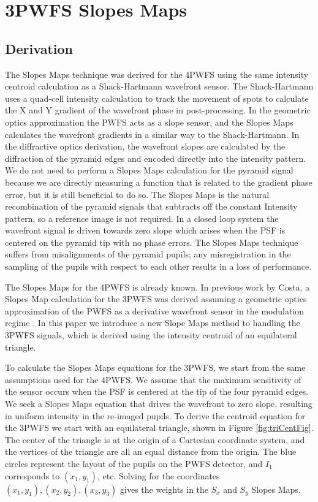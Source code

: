 \section{3PWFS Slopes Maps}\label{Slopes}

\subsection{Derivation}\label{SlopesDerivation}

The Slopes Maps technique was derived for the 4PWFS using the same intensity centroid calculation as a Shack-Hartmann wavefront sensor. The Shack-Hartmann uses a quad-cell intensity calculation to track the movement of spots to calculate the X and Y gradient of the wavefront phase in post-processing. In the geometric optics approximation the PWFS acts as a slope sensor, and the Slopes Maps calculates the wavefront gradients in a similar way to the Shack-Hartmann. In the diffractive optics derivation, the wavefront slopes are calculated by the diffraction of the pyramid edges and encoded directly into the intensity pattern. We do not need to perform a Slopes Maps calculation for the pyramid signal because we are directly measuring a function that is related to the gradient phase error, but it is still beneficial to do so. The Slopes Maps is the natural recombination of the pyramid signals that subtracts off the constant Intensity pattern, so a reference image is not required. In a closed loop system the wavefront signal is driven towards  zero slope which arises when the PSF is centered on the pyramid tip with no phase errors. The Slopes Maps technique suffers from misalignments of the pyramid pupils; any misregistration in the sampling of the pupils with respect to each other results in a loss of performance. 

The Slopes Maps for the 4PWFS is already known. In previous work by Costa, a Slopes Map calculation for the 3PWFS was derived assuming a geometric optics approximation of the PWFS as a derivative wavefront sensor in the modulation regime \citep{buchler2004development}. In this paper we introduce a new Slope Maps method to handling the 3PWFS signals, which is derived using the intensity centroid of an equilateral triangle.

To calculate the Slopes Maps equations for the 3PWFS, we start from the same assumptions used for the 4PWFS. We assume that the maximum sensitivity of the sensor occurs when the PSF is centered at the tip of the four pyramid edges. We seek a Slopes Maps equation that drives the wavefront to zero slope, resulting in uniform intensity in the re-imaged pupils. To derive the centroid equation for the 3PWFS we start with an equilateral triangle, shown in Figure \ref{fig:triCentFig}. The center of the triangle is at the origin of a Cartesian coordinate system, and the vertices of the triangle are all an equal distance from the origin. The blue circles represent the layout of the pupils on the PWFS detector, and $I_1$ corresponds to $(x_1, y_1)$, etc. Solving for the coordinates $(x_1,y_1),(x_2,y_2), (x_3,y_3)$ gives the weights in the $S_x$ and $S_y$ Slopes Maps. 

